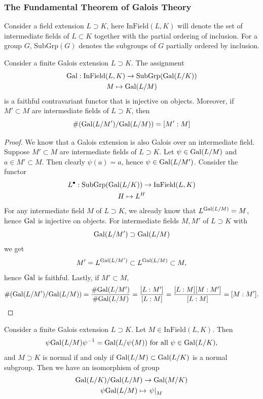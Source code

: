 \subsubsection{The Fundamental Theorem of Galois Theory}
\begin{definition}
    Consider a field extension $L\supset K$, here $\mathrm{InField}(L,K)$ will denote the set of intermediate fields of $L\subset K$ together with the partial ordering of inclusion. For a group $G$, $\mathrm{SubGrp}(G)$ denotes the subgroups of $G$ partially ordered by inclusion.  
\end{definition} 
\begin{lemma}\label{FaithfulGaloisCorrespondenceInjectiveOnObjects}
    Consider a finite Galois extension $L\supset K$. The assignment 
    \begin{gather*}
        \mathrm{Gal}: \mathrm{InField}(L,K) \rightarrow \mathrm{SubGrp}(\mathrm{Gal}(L/K))\\
        M \mapsto \mathrm{Gal}(L/M) 
    \end{gather*}
    is a faithful contravariant functor that is injective on objects. Moreover, if $M'\subset M$ are intermediate fields of $L\supset K$, then
    $$
        \#(\mathrm{Gal}(L/M')/\mathrm{Gal}(L/M)) =[M' : M]
    $$ 
\end{lemma}
\begin{proof}
    We know that a Galois extension is also Galois over an intermediate field. Suppose $M'\subset M$ are intermediate fields of $L\supset K$. Let $\psi\in \mathrm{Gal}(L/M)$ and $a\in M'\subset M$. Then clearly $\psi(a) = a$, hence $\psi\in \mathrm{Gal}(L/M')$. Consider the functor 
    \begin{gather*}
        L^{\bullet}:\mathrm{SubGrp}(\mathrm{Gal}(L/K)) \rightarrow \mathrm{InField}(L,K)\\
        H\mapsto L^H
    \end{gather*}
    For any intermediate field $M$ of $L\supset K$, we already know that $L^{\mathrm{Gal}(L/M)}=M$, hence $\mathrm{Gal}$ is injective on objects. For intermediate fields $M,M'$ of $L\supset K$ with   
    $$
        \mathrm{Gal}(L/M')\supset \mathrm{Gal}(L/M)
    $$
    we get 
    $$
        M'=L^{\mathrm{Gal}(L/M')}\subset L^{\mathrm{Gal}(L/M)}\subset M,
    $$
    hence $\mathrm{Gal}$ is faithful. Lastly, if $M'\subset M$,
    $$
        \#(\mathrm{Gal}(L/M')/\mathrm{Gal}(L/M)) = \frac{\#\mathrm{Gal}(L/M')}{\#\mathrm{Gal}(L/M)} = \frac{[L:M']}{[L:M]} = \frac{[L:M][M:M']}{[L:M]} = [M : M'].
    $$
\end{proof}
\begin{lemma}\label{ConjugationOfGaloisGroupByArbitraryAutomorphismAndNormalcyOfExtensionAndGroup}
    Consider a finite Galois extension $L\supset K$. Let $M\in \mathrm{InField}(L,K)$. Then 
    $$
        \psi\mathrm{Gal}(L/M)\psi^{-1} = \mathrm{Gal}(L/\psi(M)) \text{ for all } \psi\in \mathrm{Gal}(L/K),
    $$
    and $M\supset K$ is normal if and only if $\mathrm{Gal}(L/M)\subset \mathrm{Gal}(L/K)$ is a normal subgroup. Then we have an isomorphism of group 
    \begin{gather*}
        \mathrm{Gal}(L/K)/\mathrm{Gal}(L/M) \rightarrow \mathrm{Gal}(M/K)\\
        \psi\mathrm{Gal}(L/M) \mapsto \left.\psi\right|_M
    \end{gather*} 
\end{lemma}
